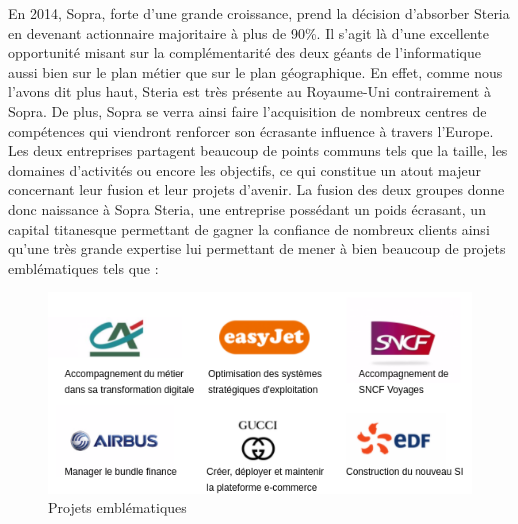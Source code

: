 En 2014, Sopra, forte d'une grande croissance, prend la décision d'absorber Steria en devenant actionnaire majoritaire à plus de 90\%. Il s'agit là d'une excellente opportunité misant sur la complémentarité des deux géants de l'informatique aussi bien sur le plan métier que sur le plan géographique. En effet, comme nous l'avons dit plus haut, Steria est très présente au Royaume-Uni contrairement à Sopra. De plus, Sopra se verra ainsi faire l'acquisition de nombreux centres de compétences qui viendront renforcer son écrasante influence à travers l'Europe. Les deux entreprises partagent beaucoup de points communs tels que la taille, les domaines d'activités ou encore les objectifs, ce qui constitue un atout majeur concernant leur fusion et leur projets d'avenir. La fusion des deux groupes donne donc naissance à Sopra Steria, une entreprise possédant un poids écrasant, un capital titanesque permettant de gagner la confiance de nombreux clients ainsi qu'une très grande expertise lui permettant de mener à bien beaucoup de projets emblématiques tels que : \\

\begin{figure}[h]
	\includegraphics[scale=0.8]{images/entreprise/projetsEmblematiques.png}
	\centering
	\caption{Projets emblématiques}
	\label{projetsEmblematiques}
\end{figure}
		